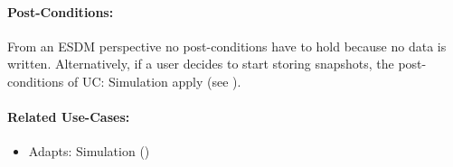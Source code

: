 \paragraph{Post-Conditions:}
From an ESDM perspective no post-conditions have to hold because no data is written.
Alternatively, if a user decides to start storing snapshots, the post-conditions of UC: Simulation apply (see ).




\paragraph{Related Use-Cases:}
\begin{itemize}
	\item Adapts: Simulation ()
\end{itemize}


